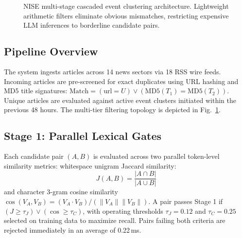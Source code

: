 \documentclass[conference]{IEEEtran}
\begin{document}
\begin{figure}[!t]
\caption{NISE multi-stage cascaded event clustering architecture. Lightweight arithmetic filters eliminate obvious mismatches, restricting expensive LLM inferences to borderline candidate pairs.}
\label{fig:architecture}
\end{figure}

\subsection{Pipeline Overview}
The system ingests articles across 14 news sectors via 18 RSS wire feeds.
Incoming articles are pre-screened for exact duplicates using URL hashing and MD5 title signatures:
$\text{Match} = (\text{url} = U) \lor (\text{MD5}(T_1) = \text{MD5}(T_2))$.
Unique articles are evaluated against active event clusters initiated within the previous 48 hours.
The multi-tier filtering topology is depicted in Fig.~\ref{fig:architecture}.

\subsection{Stage 1: Parallel Lexical Gates}
Each candidate pair $(A, B)$ is evaluated across two parallel token-level similarity metrics:
whitespace unigram Jaccard similarity:
\begin{equation}
J(A, B) = \frac{|A \cap B|}{|A \cup B|}
\label{eq:jaccard}
\end{equation}
and character 3-gram cosine similarity $\cos(V_A, V_B) = (V_A \cdot V_B) / (\|V_A\| \|V_B\|)$.
A pair passes Stage 1 if $(J \ge \tau_J) \lor (\cos \ge \tau_C)$, with operating thresholds $\tau_J = 0.12$ and $\tau_C = 0.25$ selected on training data to maximize recall.
Pairs failing both criteria are rejected immediately in an average of 0.22\,ms.
\end{document}
